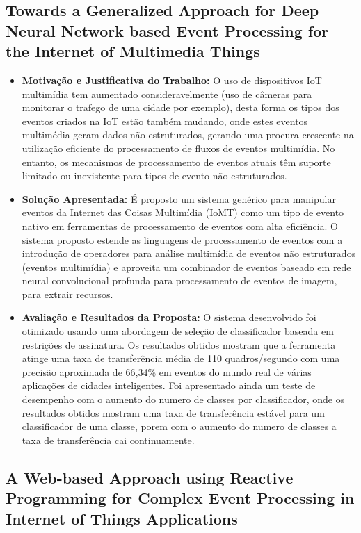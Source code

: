 \documentclass[tid,table]{texufpel} %
\begin{document}
\subsection{Towards a Generalized Approach for Deep Neural Network based Event Processing for the Internet of Multimedia Things}


\begin{itemize}
	\item \textbf{Motivação e Justificativa do Trabalho:} O uso de dispositivos IoT multimídia tem aumentado consideravelmente (uso de câmeras para monitorar o trafego de uma cidade por exemplo), desta forma os tipos dos eventos criados na IoT estão também mudando, onde estes eventos multimédia geram dados não estruturados, gerando uma procura crescente na utilização eficiente do processamento de fluxos de eventos multimídia. No entanto, os mecanismos de processamento de eventos atuais têm suporte limitado ou inexistente para tipos de evento não estruturados.
	
	\item \textbf{Solução Apresentada:} É proposto um sistema genérico para manipular eventos da Internet das Coisas Multimídia (IoMT) como um tipo de evento nativo em ferramentas de processamento de eventos com alta eficiência. O sistema proposto estende as linguagens de processamento de eventos com a introdução de operadores para análise multimídia de eventos não estruturados (eventos multimídia) e aproveita um combinador de eventos baseado em rede neural convolucional profunda para processamento de eventos de imagem, para extrair recursos.
	
	\item \textbf{Avaliação e Resultados da Proposta:} O sistema desenvolvido foi otimizado usando uma abordagem de seleção de classificador baseada em restrições de assinatura. Os resultados obtidos mostram que a ferramenta atinge uma taxa de transferência média de 110 quadros/segundo com uma precisão aproximada de 66,34\% em eventos do mundo real de várias aplicações de cidades inteligentes. Foi apresentado ainda um teste de desempenho com o aumento do numero de classes por classificador, onde os resultados obtidos mostram uma taxa de transferência estável para um classificador de uma classe, porem com o aumento do numero de classes a taxa de transferência cai continuamente.  
	
\end{itemize}


\subsection{A Web-based Approach using Reactive Programming for Complex Event Processing in Internet of Things Applications}
\end{document}
